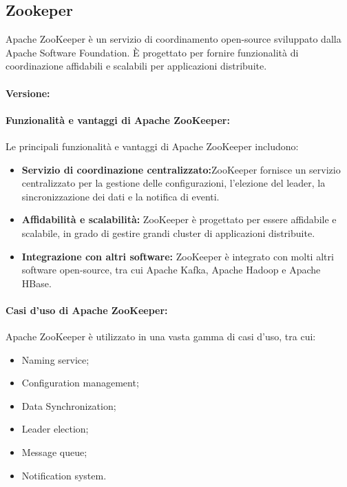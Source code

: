 \subsection{Zookeper}
Apache ZooKeeper è un servizio di coordinamento open-source sviluppato dalla Apache Software Foundation. È progettato per fornire funzionalità di coordinazione affidabili e scalabili per applicazioni distribuite.

\paragraph*{Versione:}

\paragraph*{Funzionalità e vantaggi di Apache ZooKeeper:}
Le principali funzionalità e vantaggi di Apache ZooKeeper includono:
\begin{itemize}
    \item \textbf{Servizio di coordinazione centralizzato:}ZooKeeper fornisce un servizio centralizzato per la gestione delle configurazioni, l'elezione del leader, la sincronizzazione dei dati e la notifica di eventi.
    \item \textbf{Affidabilità e scalabilità:} ZooKeeper è progettato per essere affidabile e scalabile, in grado di gestire grandi cluster di applicazioni distribuite.
    \item \textbf{Integrazione con altri software:} ZooKeeper è integrato con molti altri software open-source, tra cui Apache Kafka, Apache Hadoop e Apache HBase.
\end{itemize}
 
\paragraph*{Casi d'uso di Apache ZooKeeper:}

Apache ZooKeeper è utilizzato in una vasta gamma di casi d'uso, tra cui:
\begin{itemize}
    \item Naming service;
    \item Configuration management;
    \item Data Synchronization;
    \item Leader election;
    \item Message queue;
    \item Notification system.
\end{itemize}

